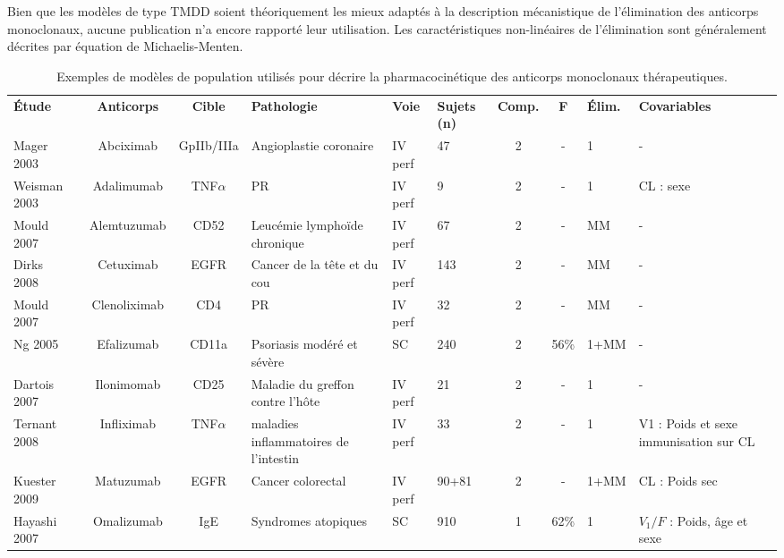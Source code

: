 Bien que les modèles de type TMDD soient théoriquement les mieux adaptés à la description mécanistique de l'élimination des anticorps monoclonaux, aucune publication n'a encore rapporté leur utilisation. Les caractéristiques non-linéaires de l'élimination sont généralement décrites par équation de Michaelis-Menten.  

\begin{table}[!ht]
  \centering
  \caption{Exemples de modèles de population utilisés pour décrire la pharmacocinétique des anticorps monoclonaux thérapeutiques.}
    \begin{tabular}{p{1.6cm}ccp{1.8cm}p{.8cm}p{.9cm}ccp{.9cm}l}
      &&&&&&&&& \\
      \hline
\textbf{Étude} & \textbf{Anticorps} & \textbf{Cible} & \textbf{Pathologie} & \textbf{Voie} & \textbf{Sujets (n)} & \textbf{Comp.} & \textbf{F} & \textbf{Élim.} & \textbf{Covariables} \\
      \hline
      \hline
      Mager 2003~\citep{REF65} & Abciximab & GpIIb/IIIa & Angioplastie coronaire & \gls{IV} perf & 47 & 2 & - & 1 & - \\
      Weisman 2003~\citep{REF66} & Adalimumab & TNF$\alpha$ & PR & \gls{IV} perf & 9 & 2 & - & 1 & \gls{CL} : sexe \\
      Mould 2007~\citep{REF67} & Alemtuzumab & CD52 & Leucémie lymphoïde chronique & \gls{IV} perf & 67 & 2 & - & MM & - \\
      Dirks 2008~\citep{REF68} & Cetuximab & EGFR & Cancer de la tête et du cou & \gls{IV} perf & 143 & 2 & - & MM & - \\
      Mould 2007~\citep{REF69} & Clenoliximab & CD4 & PR & \gls{IV} perf & 32 & 2 & - & MM & - \\
      Ng 2005~\citep{REF50} & Efalizumab & CD11a & Psoriasis modéré et sévère & SC & 240 & 2 & 56\% & 1+MM & - \\
      Dartois 2007~\citep{REF70} & Ilonimomab & CD25 & Maladie du greffon contre l'hôte & \gls{IV} perf & 21 & 2 & - & 1 & - \\
      Ternant 2008~\citep{REF71} & Infliximab & TNF$\alpha$ & maladies inflammatoires de l'intestin & \gls{IV} perf & 33 & 2 & - & 1 & V1 : Poids et sexe immunisation sur \gls{CL} \\
      Kuester 2009~\citep{REF72} & Matuzumab & EGFR & Cancer colorectal & \gls{IV} perf & 90+81 & 2 & - & 1+MM & \gls{CL} : Poids sec \\
      Hayashi 2007~\citep{REF61} & Omalizumab & IgE & Syndromes atopiques & SC & 910 & 1 & 62\% & 1 & $V_1/F$ : Poids,  âge et sexe \\

\end{tabular}
\end{table}
